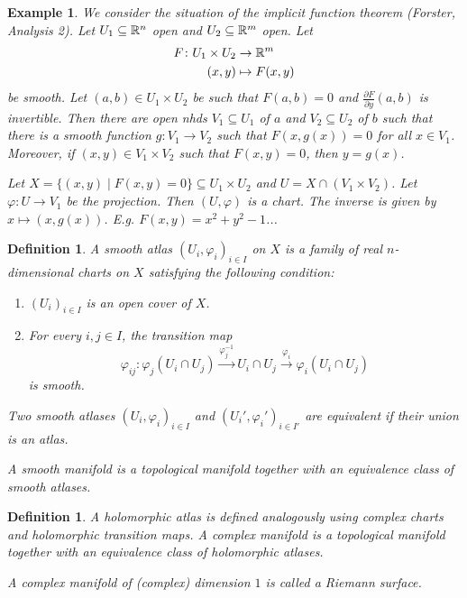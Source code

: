 \documentclass[A4paper, british]{amsart}
\theoremstyle{darkgreentheorem}
\theoremstyle{darkbluedefinition}
\newtheorem{defn}[thm]{Definition}
\theoremstyle{darkredexample}
\newtheorem{exa}[thm]{Example}
\theoremstyle{remark}
\newcommand{\1}{\mathbbm{1}}
\newcommand{\tms}{\times}
\begin{document}
\begin{exa}
    We consider the situation of the implicit function theorem (Forster, Analysis 2).
    Let $U_{1}\subseteq \mathbb{R}^{n}$ open and $U_{2}\subseteq \mathbb{R}^{m}$ open.
    Let
    \begin{align*}
	F\colon U_{1}\times U_{2} &\to \mathbb{R}^{m} \\
	(x,y) &\mapsto F(x,y)
    \end{align*}
    be smooth.
    Let $(a,b)\in U_{1}\times U_{2}$ be such that $F(a,b)=0$ and $\frac{\partial F}{\partial y}(a,b)$ is invertible.
    Then there are open nhds $V_{1}\subseteq U_{1}$ of $a$ and $V_{2}\subseteq U_{2}$ of $b$ such that there is a smooth function $g\colon V_{1}\to V_{2}$ such that $F(x,g(x))=0$ for all $x\in V_{1}$.
    Moreover, if $(x,y)\in V_{1}\times V_{2}$ such that $F(x,y)=0$, then $y=g(x)$.

    Let $X=\{(x,y)\mid F(x,y)=0\} \subseteq U_{1}\times U_{2}$ and $U=X\cap (V_{1}\tms V_{2})$.
    Let $\varphi \colon U\to V_{1}$ be the projection.
    Then $(U,\varphi)$ is a chart.
    The inverse is given by $x\mapsto (x,g(x))$.
    E.g. $F(x,y)=x^{2}+y^{2}-1$...
\end{exa}

\begin{defn}
    A \textit{smooth atlas} $(U_{i},\varphi_{i})_{i\in I}$ on $X$ is a family of real $n$-dimensional charts on $X$ satisfying the following condition:
    \begin{enumerate}[label=\arabic*)]
	\item $(U_{i})_{i\in I}$ is an open cover of $X$.
	\item For every $i,j\in I$, the transition map
	    \[\varphi_{ij}\colon \varphi_{j}(U_{i}\cap U_{j})\xrightarrow{\varphi_{j}^{-1}} U_{i}\cap U_{j}\xrightarrow{\varphi_{i}} \varphi_{i}(U_{i}\cap U_{j}) \]
	    is smooth.
    \end{enumerate}
    Two smooth atlases $(U_{i},\varphi_{i})_{i\in I}$ and $(U_{i}',\varphi_{i}')_{i\in I'}$ are equivalent if their union is an atlas.

    A \textit{smooth manifold} is a topological manifold together with an equivalence class of smooth atlases.
\end{defn}

\begin{defn}
    A \textit{holomorphic atlas} is defined analogously using complex charts and holomorphic transition maps.
    A \textit{complex manifold} is a topological manifold together with an equivalence class of holomorphic atlases.

    A complex manifold of (complex) dimension $1$ is called a \textit{Riemann surface}.
\end{defn}
\end{document}

